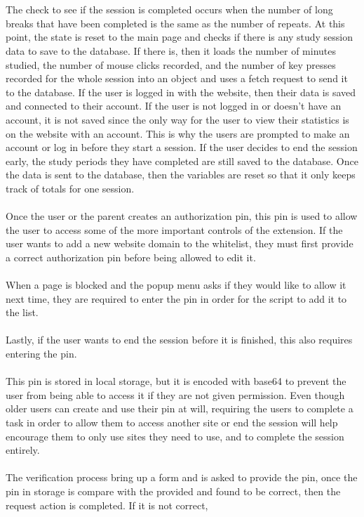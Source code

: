 \documentclass[12pt]{article}
\begin{document}
\\\\The check to see if the session is completed occurs when the number of long breaks that have been completed is the same as the number of repeats. 
At this point, the state is reset to the main page and checks if there is any study session data to save to the database. If there is, then it loads the number of minutes studied, 
the number of mouse clicks recorded, and the number of key presses recorded for the whole session into an object and uses a fetch request to send it to the database. If the user is logged in with 
the website, then their data is saved and connected to their account. If the user is not logged in or doesn't have an account, it is not saved since the only way for the user to view their statistics 
is on the website with an account. This is why the users are prompted to make an account or log in before they start a session. 
If the user decides to end the session early, the study periods they have completed are still saved to the database.
Once the data is sent to the database, then the variables are reset so that it only keeps track of totals for one session.
\\\\
\indent Once the user or the parent creates an authorization pin, this pin is used to allow the user to access some of the more important controls of the extension. If the user wants to add a new website domain to 
the whitelist, they must first provide a correct authorization pin before being allowed to edit it. 
\\\\\indent When a page is blocked and the popup menu asks if they would like to allow it next time, they are required to enter the 
pin in order for the script to add it to the list. 
\\\\\indent Lastly, if the user wants to end the session before it is finished, this also requires entering the pin. 
\\\\\indent This pin is stored in local storage, but it is encoded with base64 to prevent the user from being able to access it if they are 
not given permission. Even though older users can create and use their pin at will, requiring the users to complete a task in order to allow them to access another site 
or end the session will help encourage them to only use sites they need to use, and to complete the session entirely. 
\\\\\indent The verification process bring up a form and is asked to provide the pin, once the pin in storage is compare with the provided and found to be correct, then the request action is completed. If it is not correct, 
\end{document}
